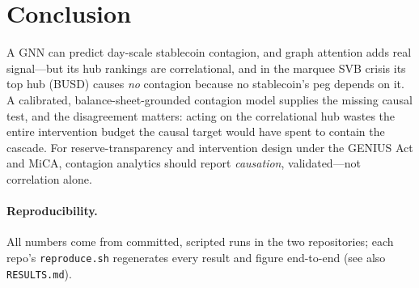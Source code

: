 \documentclass[sigconf,nonacm]{acmart}
\begin{document}
\section{Conclusion}
A GNN can predict day-scale stablecoin contagion, and graph attention adds real signal---but its
hub rankings are correlational, and in the marquee SVB crisis its top hub (BUSD) causes \emph{no}
contagion because no stablecoin's peg depends on it. A calibrated, balance-sheet-grounded
contagion model supplies the missing causal test, and the disagreement matters: acting on the
correlational hub wastes the entire intervention budget the causal target would have spent to
contain the cascade. For reserve-transparency and intervention design under the GENIUS Act and
MiCA, contagion analytics should report \emph{causation}, validated---not correlation alone.

\paragraph{Reproducibility.} All numbers come from committed, scripted runs in the two
repositories; each repo's \texttt{reproduce.sh} regenerates every result and figure end-to-end
(see also \texttt{RESULTS.md}).



\end{document}
